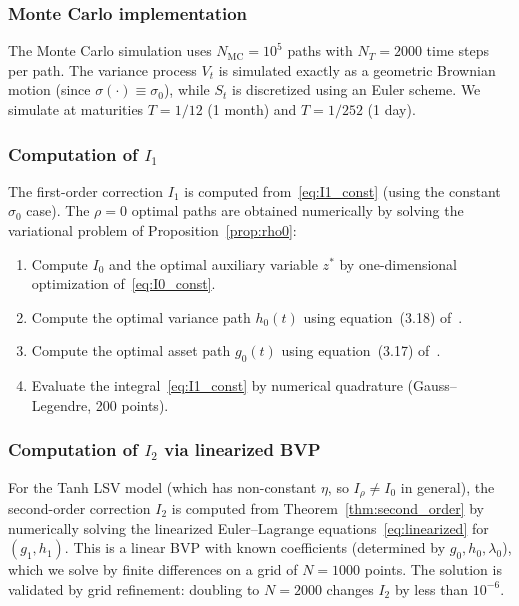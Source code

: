 \documentclass[11pt]{article}
\theoremstyle{definition}
\begin{document}
\subsubsection{Monte Carlo implementation}

The Monte Carlo simulation uses $N_{\mathrm{MC}} = 10^5$ paths with $N_T = 2000$ time steps per path. The variance process $V_t$ is simulated exactly as a geometric Brownian motion (since $\sigma(\cdot) \equiv \sigma_0$), while $S_t$ is discretized using an Euler scheme. We simulate at maturities $T = 1/12$ (1 month) and $T = 1/252$ (1 day).

\subsubsection{Computation of $I_1$}

The first-order correction $I_1$ is computed from~\eqref{eq:I1_const} (using the constant $\sigma_0$ case). The $\rho = 0$ optimal paths are obtained numerically by solving the variational problem of Proposition~\ref{prop:rho0}:
\begin{enumerate}[label=\arabic*.]
  \item Compute $I_0$ and the optimal auxiliary variable $z^*$ by one-dimensional optimization of~\eqref{eq:I0_const}.
  \item Compute the optimal variance path $h_0(t)$ using equation~(3.18) of~\cite{PWZ2025}.
  \item Compute the optimal asset path $g_0(t)$ using equation~(3.17) of~\cite{PWZ2025}.
  \item Evaluate the integral~\eqref{eq:I1_const} by numerical quadrature (Gauss--Legendre, 200 points).
\end{enumerate}

\subsubsection{Computation of $I_2$ via linearized BVP}

For the Tanh LSV model (which has non-constant $\eta$, so $I_\rho \neq I_0$ in general), the second-order correction $I_2$ is computed from Theorem~\ref{thm:second_order} by numerically solving the linearized Euler--Lagrange equations~\eqref{eq:linearized} for $(g_1, h_1)$. This is a linear BVP with known coefficients (determined by $g_0, h_0, \lambda_0$), which we solve by finite differences on a grid of $N = 1000$ points. The solution is validated by grid refinement: doubling to $N = 2000$ changes $I_2$ by less than $10^{-6}$.
\end{document}
